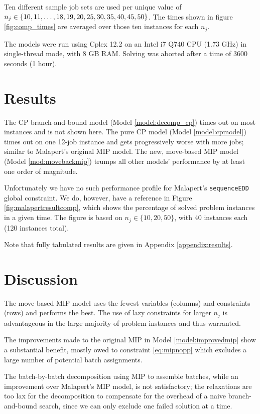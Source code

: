 \documentclass[13pt, letterpaper, oneside]{book}
\begin{document}
Ten different sample job sets are
used per unique value of $n_j \in \{10, 11, \dots, 18, 19, 20, 25,\\ 30, 35, 40, 45, 50\}$. The times shown in figure \ref{fig:comp_times}
are averaged over those ten instances for each $n_j$.

The models were run using Cplex 12.2 \citep{cplex} on an Intel i7 Q740 CPU (1.73 GHz) in single-thread mode, with 8 GB RAM.
Solving was aborted after a time of 3600 seconds (1 hour).

\section{Results}
\label{sec:results}
The CP branch-and-bound model (Model \ref{model:decomp_cp}) times out on most instances and is not shown here.
The pure CP model (Model \ref{model:cpmodel}) times out on one 12-job instance and gets progressively worse
with more jobs; similar to Malapert's original MIP model.
 The new, move-based MIP model (Model
\ref{mod:movebackmip}) trumps all other
models' performance by at least one order of magnitude.

Unfortunately we have no such performance profile for Malapert's
\texttt{sequenceEDD} global constraint. We do, however, have a reference in
Figure \ref{fig:malapertresultcomp}, which shows the percentage of solved
problem instances in a given time. The figure is based on $n_j \in \{10, 20,
50\}$, with 40 instances each (120 instances total).


Note that fully tabulated results are given in Appendix \ref{appendix:results}.

\section{Discussion}\label{sec:discussion}
The move-based MIP model uses the fewest variables (columns) and
constraints (rows) and performs the best. The use of lazy constraints for
larger $n_j$ is advantageous in the large majority of problem instances and thus
warranted. 

The improvements made to the original MIP in Model \ref{model:improvedmip} show
a substantial benefit, mostly owed to constraint \eqref{eq:mipnopp} which
excludes a large number of potential batch assignments.

The batch-by-batch decomposition using MIP to assemble batches, while an
improvement over Malapert's MIP model, is not satisfactory; the relaxations are
too lax for the decomposition to compensate for the overhead of a naive
branch-and-bound search, since we can only exclude one failed solution at a
time.
\end{document}
